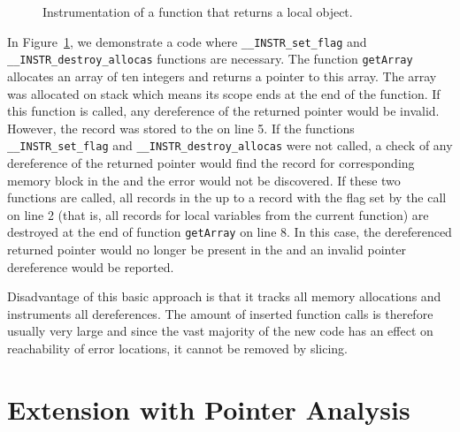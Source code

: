 \begin{figure}[t]

\caption{Instrumentation of a function that returns a local object.}
\label{fig:examplesetflags}
\end{figure}

In Figure~\ref{fig:examplesetflags}, we demonstrate a code where
\texttt{\_\_INSTR\_set\_flag} and \texttt{\_\_INSTR\_destroy\_allocas}
functions are necessary. The function \texttt{getArray} allocates an array of
ten integers and returns a pointer to this array. The array was allocated on
stack which means its scope ends at the end of the function. If this function
is called, any dereference of the returned pointer would be invalid. However,
the record was stored to the \stacklist on line 5.  If the functions
\texttt{\_\_INSTR\_set\_flag} and \texttt{\_\_INSTR\_destroy\_allocas} were not
called, a check of any dereference of the returned pointer would find the
record for corresponding memory block in the \stacklist and the error would not
be discovered. If these two functions are called, all records in the \stacklist
up to a record with the flag set by the call on line 2 (that is, all records
for local variables from the current function) are destroyed at the end of
    function \texttt{getArray} on line 8. In this case, the dereferenced
    returned pointer would no longer be present in the \stacklist and an
    invalid pointer dereference would be reported.

Disadvantage of this basic approach is that it tracks all memory allocations and
instruments all dereferences. The amount of inserted function calls is
therefore usually very large and since the vast majority of the new code has
an effect on reachability of error locations, it cannot be removed by slicing.

\section{Extension with Pointer Analysis}\label{sec:pta}

